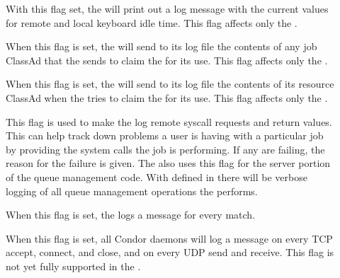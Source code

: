 \begin{description}
\begin{description}
  \item[] \label{dflag:keyboard} 
    With this flag set, the  will print out a log message
    with the current values for remote and local keyboard idle time.
    This flag affects only the .

  \item[] \label{dflag:job}
    When this flag is set, the
     will send to its log file the contents of any
    job ClassAd that the  sends to claim the
     for its use.  This flag affects only the
    .
    
  \item[] \label{dflag:machine}
    When this flag is set,
    the  will send to its log file the contents of
    its resource ClassAd when the  tries to claim the
     for its use.  This flag affects only the
    .

  \item[] \label{dflag:syscalls}
    This flag is used to
    make the  log remote syscall requests and return
    values.  This can help track down problems a user is having with a
    particular job by providing the system calls the job is
    performing. If any are failing, the reason for the
    failure is given.  The  also uses this flag for the server
    portion of the queue management code.  With 
    defined in  there will be verbose logging of all
    queue management operations the  performs.  

  \item[] \label{dflag:match}
    When this flag is
    set, the  logs a message for every match.

  \item[] \label{dflag:network}
    When this flag is set,
    all Condor daemons will log a message on every TCP accept, connect,
    and close, and on every UDP send and receive.  This flag is not
    yet fully supported in the .


\end{description}
\end{description}
